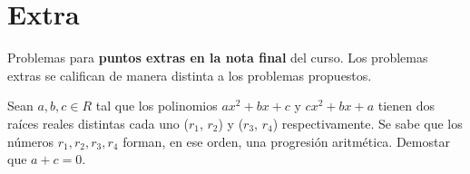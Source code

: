 \section{Extra}

Problemas para \textbf{puntos extras en la nota final} del curso.
Los problemas extras se califican de manera distinta a los problemas propuestos.

\begin{problem}
    Sean $a, b, c \in R$ tal que los polinomios $ax^2 + bx + c$ y $cx^2 + bx + a$
    tienen dos raíces reales distintas cada uno ($r_1$, $r_2$) y ($r_3$, $r_4$) respectivamente.
    Se sabe que los números $r_1, r_2, r_3, r_4$ forman, en ese orden, una progresión aritmética.
    Demostar que $a + c = 0.$
\end{problem}